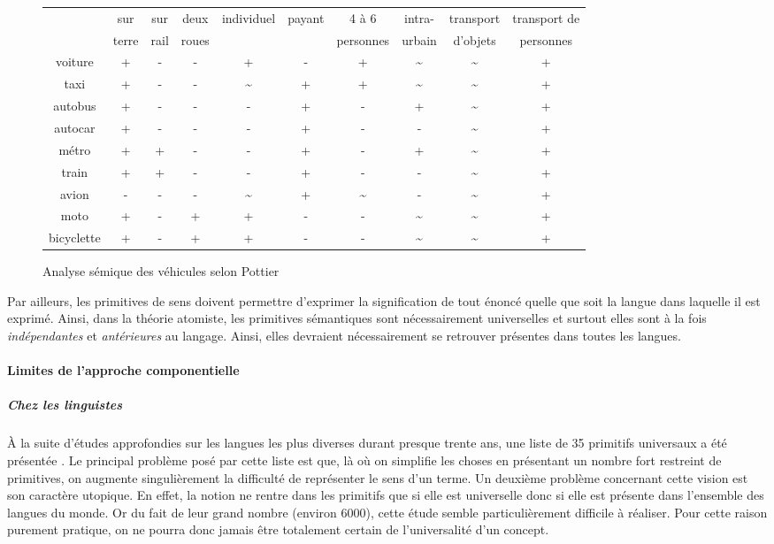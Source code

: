 {\begin{figure}%
\begin{center}
  {\fontsize{10}{11}\selectfont
  \begin{tabular}{|c|c|c|c|c|c|c|c|c|c|}
\hline
& sur & sur & deux & individuel & payant & 4 à 6 & intra- & transport
& transport de \\ & terre & rail & roues & & & personnes & urbain &
d'objets & personnes\\
\hline voiture&+&-&-&+&-&+&\~{}&\~{}&+\\ \hline
taxi&+&-&-&\~{}&+&+&\~{}&\~{}&+\\ \hline
autobus&+&-&-&-&+&-&+&\~{}&+\\ \hline autocar&+&-&-&-&+&-&-&\~{}&+\\
\hline métro&+&+&-&-&+&-&+&\~{}&+\\ \hline
train&+&+&-&-&+&-&-&\~{}&+\\ \hline avion&-&-&-&\~{}&+&\~{}&-&\~{}&+\\
\hline moto&+&-&+&+&-&-&\~{}&\~{}&+\\ \hline
bicyclette&+&-&+&+&-&-&\~{}&\~{}&+\\ \hline
\end{tabular}
}
\end{center}
\caption{Analyse sémique des véhicules selon Pottier}
\label{fig:an-sem-Pottier}
\end{figure} 

Par ailleurs, les primitives de sens doivent permettre d'exprimer la signification
de tout énoncé quelle que soit la langue dans laquelle il est exprimé.
Ainsi, dans la théorie atomiste, les primitives sémantiques sont
nécessairement universelles et surtout elles sont à la fois
\emph{indépendantes} et \emph{antérieures} au langage. Ainsi, elles
devraient nécessairement se retrouver présentes dans toutes les
langues.

\paragraph{Limites de l'approche componentielle}
\subparagraph{Chez les linguistes}\label{sec:chez-les-linguistes}

À la suite d'études approfondies sur les langues les plus diverses
durant presque trente ans, une liste
de 35 primitifs universaux  a été présentée \cite{Wierzbicka1993}.
Le principal problème posé par cette liste est que, là où on simplifie
les choses en présentant un nombre fort restreint de primitives, on
augmente singulièrement la difficulté de représenter le sens d'un
terme. Un deuxième problème concernant cette vision est son
caractère utopique. En effet, la notion ne rentre dans les primitifs
que si elle est universelle donc si elle est présente dans l'ensemble
des langues du monde. Or du fait de leur grand nombre (environ 6000), cette étude semble particulièrement difficile à
réaliser. Pour cette raison purement pratique, on ne pourra donc
jamais être totalement certain de l'universalité d'un concept.

}
